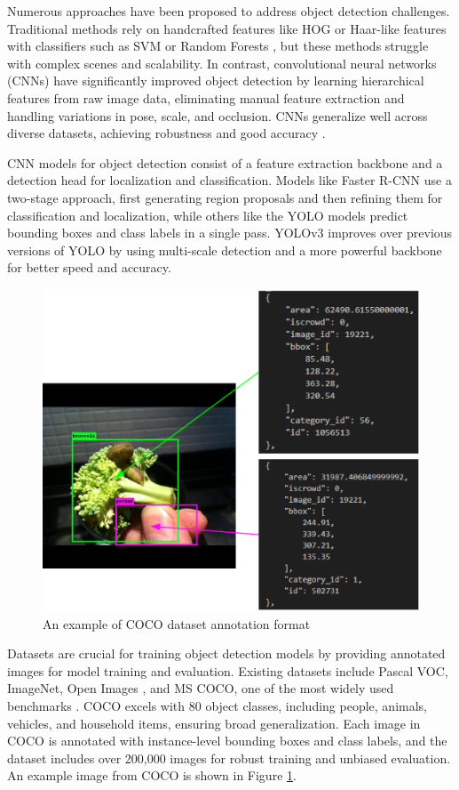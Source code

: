 \documentclass[10pt]{cai}
\begin{document}
Numerous approaches have been proposed to address object detection challenges. Traditional methods rely on handcrafted features like HOG or Haar-like features with classifiers such as SVM or Random Forests \cite{10099639}, but these methods struggle with complex scenes and scalability. In contrast, convolutional neural networks (CNNs) have significantly improved object detection by learning hierarchical features from raw image data, eliminating manual feature extraction and handling variations in pose, scale, and occlusion. CNNs generalize well across diverse datasets, achieving robustness and good accuracy \cite{cnnvstrad}. 

CNN models for object detection consist of a feature extraction backbone and a detection head for localization and classification. Models like Faster R-CNN \cite{ren2016fasterrcnnrealtimeobject} use a two-stage approach, first generating region proposals and then refining them for classification and localization, while others like the YOLO models \cite{redmon2018yolov3incrementalimprovement} predict bounding boxes and class labels in a single pass. YOLOv3 improves over previous versions of YOLO by using multi-scale detection and a more powerful backbone for better speed and accuracy.


\begin{figure}
    \centering
    \captionsetup{justification=centering}
    \includegraphics[width=0.5\linewidth]{figs/label.PNG}
    \caption{An example of COCO dataset annotation format}
    \label{fig:coco}
\end{figure}

Datasets are crucial for training object detection models by providing annotated images for model training and evaluation. Existing datasets include Pascal VOC, ImageNet, Open Images \cite{zaidi2021survey}, and MS COCO, one of the most widely used benchmarks \cite{lin2015microsoft}. COCO excels with 80 object classes, including people, animals, vehicles, and household items, ensuring broad generalization. Each image in COCO is annotated with instance-level bounding boxes and class labels, and the dataset includes over 200,000 images for robust training and unbiased evaluation. An example image from COCO is shown in Figure \ref{fig:coco}.
\end{document}
